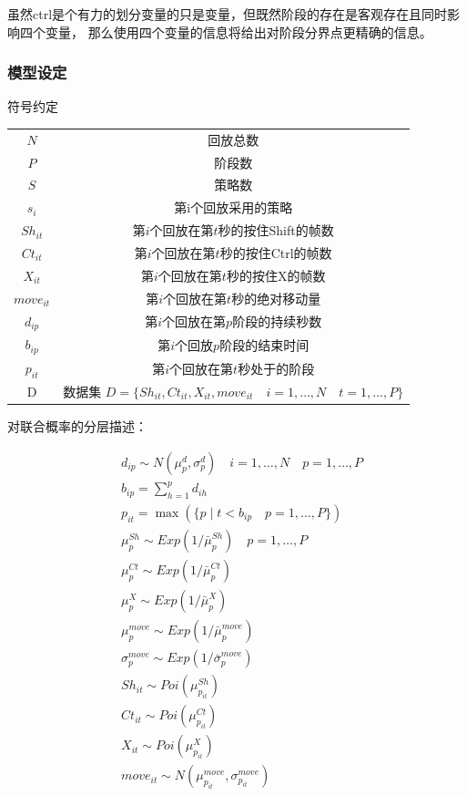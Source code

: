 \documentclass[UTF8]{ctexart}
\begin{document}
虽然ctrl是个有力的划分变量的只是变量，但既然阶段的存在是客观存在且同时影响四个变量，
那么使用四个变量的信息将给出对阶段分界点更精确的信息。


\subsubsection{模型设定}

符号约定

\begin{tabular}{c|c}
 \hline
 $N$ & 回放总数 \\
 $P$ & 阶段数 \\
 $S$ & 策略数 \\
 $s_i$ & 第i个回放采用的策略 \\
 $Sh_{it}$ & 第$i$个回放在第$t$秒的按住Shift的帧数 \\
 $Ct_{it}$ & 第$i$个回放在第$t$秒的按住Ctrl的帧数 \\
 $X_{it}$ & 第$i$个回放在第$t$秒的按住X的帧数 \\
 $move_{it}$ & 第$i$个回放在第$t$秒的绝对移动量 \\
 $d_{ip}$ & 第$i$个回放在第$p$阶段的持续秒数 \\
 $b_{ip}$ & 第$i$个回放$p$阶段的结束时间 \\
 $p_{it}$ & 第$i$个回放在第$t$秒处于的阶段 \\
  D & 数据集 $D = \{ Sh_{it},Ct_{it},X_{it},move_{it} \quad i = 1,\dots,N \quad t = 1,\dots,P \}$\\
  \hline
\end{tabular}

对联合概率的分层描述：

\begin{align*} %
& d_{ip} \sim N(\mu^d_p,\sigma^d_p) \quad i = 1,\dots,N \quad p = 1,\dots,P \\
& b_{ip} = \sum_{h=1}^p d_{ih} \\
& p_{it} = \max( \{ p \mid t < b_{ip} \quad p = 1,\dots,P \} ) \\
& \mu^{Sh}_p \sim Exp(1/\bar{\mu}^{Sh}_p) \quad p = 1,\dots,P \\
& \mu^{Ct}_p \sim Exp(1/\bar{\mu}^{Ct}_p) \\
& \mu^{X}_p \sim Exp(1/\bar{\mu}^{X}_p) \\
& \mu^{move}_p \sim Exp(1/\bar{\mu}^{move}_p) \\
& \sigma^{move}_p \sim Exp(1/\bar{\sigma}^{move}_p) \\
& Sh_{it} \sim Poi(\mu^{Sh}_{p_{it}}) \\
& Ct_{it} \sim Poi(\mu^{Ct}_{p_{it}}) \\
& X_{it} \sim Poi(\mu^{X}_{p_{it}}) \\
& move_{it} \sim N(\mu^{move}_{p_{it}},\sigma^{move}_{p_{it}}) \\
\end{align*}
\end{document}
